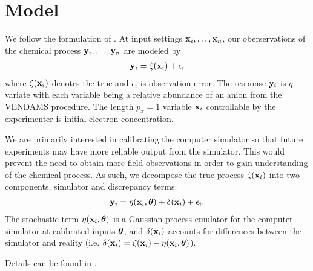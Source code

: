 \section{Model}

We follow the formulation of \cite{kennedy:2001}. At input settings $\mathbf{\bm{x}}_i,\ldots,\mathbf{\bm{x}}_n$, our oberservations of the chemical process $\mathbf{\bm{y}}_i,\ldots,\mathbf{\bm{y}}_n$ are modeled by
\begin{eqnarray}
\mathbf{\bm{y}}_i = \zeta(\mathbf{\bm{x}}_i) + \epsilon_i
\end{eqnarray}
where $\zeta(\mathbf{\bm{x}}_i)$ denotes the true and $\epsilon_i$ is observation error. The response $\mathbf{\bm{y}}_i$ is $q$-variate with each variable being a relative abundance of an anion from the VENDAMS procedure. The length $p_x=1$ variable $\mathbf{\bm{x}}_i$ controllable by the experimenter is initial electron concentration.

We are primarily interested in calibrating the computer simulator so that future experiments may have more reliable output from the simulator. This would prevent the need to obtain more field observations in order to gain understanding of the chemical process. As such, we decompose the true process $\zeta(\mathbf{\bm{x}}_i)$ into two components, simulator and discrepancy terms:
\begin{eqnarray}
\mathbf{\bm{y}}_i = \eta(\mathbf{\bm{x}}_i, \mathbf{\bm{\theta}}) + \delta(\mathbf{\bm{x}}_i) + \epsilon_i.
\end{eqnarray}
The stochastic term $\eta(\mathbf{\bm{x}}_i, \mathbf{\bm{\theta}})$ is a Gaussian process emulator for the computer simulator at calibrated inputs $\mathbf{\bm{\theta}}$, and $\delta(\mathbf{\bm{x}}_i)$ accounts for differences between the simulator and reality (i.e. $\delta(\mathbf{\bm{x}}_i) = \zeta(\mathbf{\bm{x}}_i) - \eta(\mathbf{\bm{x}}_i, \mathbf{\bm{\theta}})$).

Details can be found in \cite{higdon:2008}.
